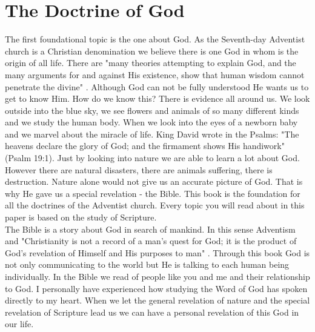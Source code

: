 \section{The Doctrine of God}
The first foundational topic is the one about God. As the Seventh-day Adventist church is a Christian denomination we believe there is one God in whom is the origin of all life. There are "many theories attempting to explain God, and the many arguments for and against His existence, show that human wisdom cannot penetrate the divine" \citep[p. 17]{ministerial1988seventh}. Although God can not be fully understood He wants us to get to know Him. How do we know this? There is evidence all around us. We look outside into the blue sky, we see flowers and animals of so many different kinds and we study the human body. When we look into the eyes of a newborn baby and we marvel about the miracle of life. King David wrote in the Psalms: "The heavens declare the glory of God; and the firmament shows His handiwork" (Psalm 19:1). Just by looking into nature we are able to learn a lot about God. However there are natural disasters, there are animals suffering, there is destruction. Nature alone would not give us an accurate picture of God. That is why He gave us a special revelation - the Bible. This book is the foundation for all the doctrines of the Adventist church. Every topic you will read about in this paper is based on the study of Scripture.\\
The Bible is a story about God in search of mankind. In this sense Adventism and "Christianity is not a record of a man's quest for God; it is the product of God's revelation of Himself and His purposes to man" \citep[p. 15]{lewis1978decide}. Through this book God is not only communicating to the world but He is talking to each human being individually. In the Bible we read of people like you and me and their relationship to God. I personally have experienced how studying the Word of God has spoken directly to my heart. When we let the general revelation of nature and the special revelation of Scripture lead us we can have a personal revelation of this God in our life.\\

